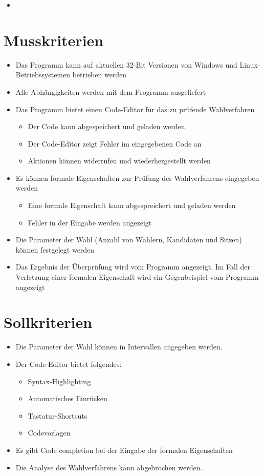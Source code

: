 \documentclass[a4paper]{scrreprt}
\begin{document}
\begin{itemize}
\item
\end{itemize}


\section{Musskriterien}
\begin{itemize}
\item Das Programm kann auf aktuellen 32-Bit Versionen von Windows und Linux-Betriebssystemen betrieben werden
\item Alle Abhängigkeiten werden mit dem Programm ausgeliefert
\item Das Programm bietet einen Code-Editor für das zu prüfende Wahlverfahren
	\begin{itemize}
	\item Der Code kann abgespeichert und geladen werden
	\item Der Code-Editor zeigt Fehler im eingegebenen Code an
	\item Aktionen können widerrufen und wiederhergestellt werden
	\end{itemize}
\item Es können formale Eigenschaften zur Prüfung des Wahlverfahrens eingegeben werden
	\begin{itemize}
	\item Eine formale Eigenschaft kann abgespreichert und geladen werden
	\item Fehler in der Eingabe werden angezeigt
	\end{itemize}
\item Die Parameter der Wahl (Anzahl von Wählern, Kandidaten und Sitzen) können festgelegt werden
\item Das Ergebnis der Überprüfung wird vom Programm angezeigt. Im Fall der Verletzung einer formalen Eigenschaft wird ein Gegenbeispiel vom Programm angezeigt
\end{itemize}


\section{Sollkriterien}
\begin{itemize}
\item Die Parameter der Wahl können in Intervallen angegeben werden.
\item Der Code-Editor bietet folgendes:
	\begin{itemize}
	\item Syntax-Highlighting
	\item Automatisches Einrücken
	\item Tastatur-Shortcuts
	\item Codevorlagen
	\end{itemize}
\item Es gibt Code completion bei der Eingabe der formalen Eigenschaften
\item Die Analyse des Wahlverfahrens kann abgebrochen werden.
\end{itemize}
\end{document}
